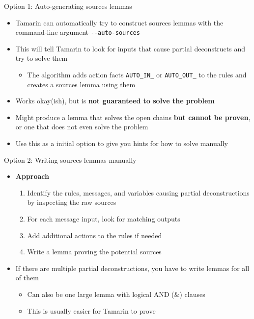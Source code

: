 \documentclass[11pt,aspectratio=169]{beamer}
\begin{document}
\begin{frame}[fragile]{Option 1: Auto-generating sources lemmas}
    \begin{itemize}
        \item Tamarin can automatically try to construct sources lemmas with 
              the command-line argument \verb|--auto-sources|
        \item This will tell Tamarin to look for inputs that cause partial 
              deconstructs and try to solve them
        \begin{itemize}
            \item The algorithm adds action facts \verb|AUTO_IN_| or
                  \verb|AUTO_OUT_| to the rules and creates a sources lemma 
                  using them
        \end{itemize}
        \item Works okay(ish), but is \textbf{not guaranteed to solve the 
                                              problem}
        \item Might produce a lemma that solves the open chains
              \textbf{but cannot be proven}, or one that does not even solve 
              the problem
        \item Use this as a initial option to give you hints for how to solve 
              manually
    \end{itemize}
\end{frame}

\begin{frame}[fragile]{Option 2: Writing sources lemmas manually}
    \begin{itemize}
        \item \textbf{Approach}
        \begin{enumerate}
            \item Identify the rules, messages, and variables causing partial 
                  deconstructions by inspecting the raw sources
            \item For each message input, look for matching outputs
            \item Add additional actions to the rules if needed
            \item Write a lemma proving the potential sources
        \end{enumerate}
        \item If there are multiple partial deconstructions, you have to write 
              lemmas for all of them
        \begin{itemize}
            \item Can also be one large lemma with logical AND (\&) clauses
            \item This is usually easier for Tamarin to prove
        \end{itemize}
    \end{itemize}
\end{frame}
\end{document}
